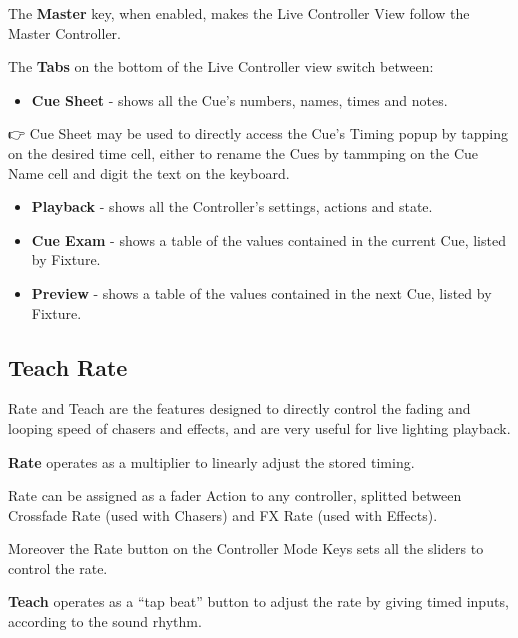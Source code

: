 \documentclass[
]{article}
\providecommand{\tightlist}{%
  \setlength{\itemsep}{0pt}\setlength{\parskip}{0pt}}
\begin{document}
The \textbf{Master} key, when enabled, makes the Live Controller View follow the Master Controller.

The \textbf{Tabs} on the bottom of the Live Controller view switch between:

\begin{itemize}
\tightlist
\item
  \textbf{Cue Sheet} - shows all the Cue's numbers, names, times and notes.
\end{itemize}

👉 Cue Sheet may be used to directly access the Cue's Timing popup by tapping on the desired time cell, either to rename the Cues by tammping on the Cue Name cell and digit the text on the keyboard.

\begin{itemize}
\tightlist
\item
  \textbf{Playback} - shows all the Controller's settings, actions and state.
\end{itemize}

\begin{itemize}
\tightlist
\item
  \textbf{Cue Exam} - shows a table of the values contained in the current Cue, listed by Fixture.
\end{itemize}

\begin{itemize}
\tightlist
\item
  \textbf{Preview} - shows a table of the values contained in the next Cue, listed by Fixture.
\end{itemize}

\hypertarget{Teach-Rate-11.6}{%
\subsection{Teach Rate}\label{Teach-Rate-11.6}}

Rate and Teach are the features designed to directly control the fading and looping speed of chasers and effects, and are very useful for live lighting playback.

\textbf{Rate} operates as a multiplier to linearly adjust the stored timing.

Rate can be assigned as a fader Action to any controller, splitted between Crossfade Rate (used with Chasers) and FX Rate (used with Effects).

Moreover the Rate button on the Controller Mode Keys sets all the sliders to control the rate.

\textbf{Teach} operates as a ``tap beat'' button to adjust the rate by giving timed inputs, according to the sound rhythm.
\end{document}

